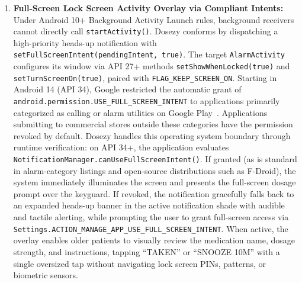\documentclass[11pt,a4paper]{article}
\begin{document}
\begin{enumerate}[leftmargin=*]
\begin{itemize}
    \end{itemize}
    For distribution targeting API 33+, Dosezy declares \texttt{USE\_EXACT\_ALARM} under the core alarm exemption, with fallback to \texttt{SCHEDULE\_EXACT\_ALARM} qualified for API 31--32 via \texttt{android:maxSdkVersion="32"} or runtime status checking via \texttt{AlarmManager.canScheduleExactAlarms()}. At runtime, the application evaluates \texttt{AlarmManager.canScheduleExactAlarms()}. If exact scheduling is revoked or denied (such as on fresh Android 14 installations where users or OEM policies have revoked exact alarm capability), Dosezy presents a high-contrast explanation dialog and dispatches an explicit system intent:
    \begin{equation*}
        \texttt{Intent(Settings.ACTION\_REQUEST\_SCHEDULE\_EXACT\_ALARM, Uri.parse("package:" + packageName))}
    \end{equation*}
    navigating the user directly to the application's dedicated system toggle to minimize cognitive and navigational friction.
    \item \textbf{Full-Screen Lock Screen Activity Overlay via Compliant Intents:} Under Android 10+ Background Activity Launch rules, background receivers cannot directly call \texttt{startActivity()}. Dosezy conforms by dispatching a high-priority heads-up notification with \texttt{setFullScreenIntent(pendingIntent, true)}. The target \texttt{AlarmActivity} configures its window via API 27+ methods \texttt{setShowWhenLocked(true)} and \texttt{setTurnScreenOn(true)}, paired with \texttt{FLAG\_KEEP\_SCREEN\_ON}. Starting in Android 14 (API 34), Google restricted the automatic grant of \texttt{android.permission.USE\_FULL\_SCREEN\_INTENT} to applications primarily categorized as calling or alarm utilities on Google Play~\cite{google2024fsi}. Applications submitting to commercial stores outside these categories have the permission revoked by default. Dosezy handles this operating system boundary through runtime verification: on API 34+, the application evaluates \texttt{NotificationManager.canUseFullScreenIntent()}. If granted (as is standard in alarm-category listings and open-source distributions such as F-Droid), the system immediately illuminates the screen and presents the full-screen dosage prompt over the keyguard. If revoked, the notification gracefully falls back to an expanded heads-up banner in the active notification shade with audible and tactile alerting, while prompting the user to grant full-screen access via \texttt{Settings.ACTION\_MANAGE\_APP\_USE\_FULL\_SCREEN\_INTENT}. When active, the overlay enables older patients to visually review the medication name, dosage strength, and instructions, tapping ``TAKEN'' or ``SNOOZE 10M'' with a single oversized tap without navigating lock screen PINs, patterns, or biometric sensors.

\end{enumerate}
\end{document}

